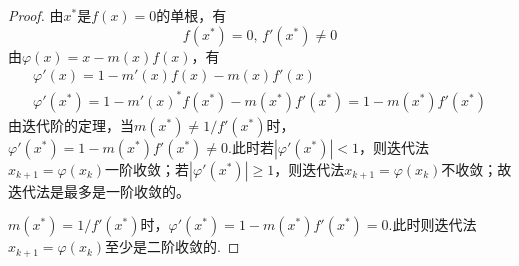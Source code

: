 \begin{proof}
    由$x^*$是$f(x) = 0$的单根，有
    \[
        f(x^*) = 0,\,f'(x^*)\neq 0
    \]
    由$\varphi(x) = x-m(x)f(x)$，有
    \[
        \begin{array}{c}
            \varphi'(x) = 1-m'(x)f(x)-m(x)f'(x)\\
            \varphi'(x^*) = 1-m'(x)^*f(x^*)-m(x^*)f'(x^*) = 1-m(x^*)f'(x^*)           
        \end{array}
    \]
    由迭代阶的定理，当$m(x^*)\neq 1/f'(x^*)$时，$\varphi'(x^*) = 1-m(x^*)f'(x^*) \neq 0$.此时若$|\varphi'(x^*)|<1$，则迭代法$x_{k+1}=\varphi(x_k)$一阶收敛；若$|\varphi'(x^*)|\geq 1$，则迭代法$x_{k+1}=\varphi(x_k)$不收敛；故迭代法是最多是一阶收敛的。

    $m(x^*)= 1/f'(x^*)$时，$\varphi'(x^*) = 1-m(x^*)f'(x^*) = 0$.此时则迭代法$x_{k+1}=\varphi(x_k)$至少是二阶收敛的.
\end{proof}
